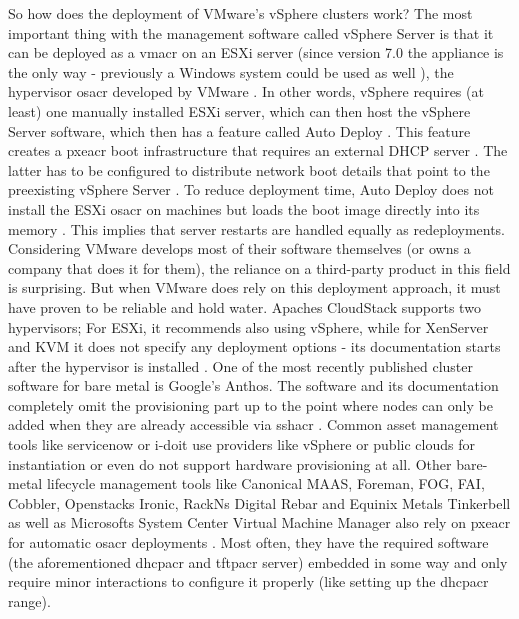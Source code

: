 So how does the deployment of VMware's vSphere clusters work? The most important thing with the management software called vSphere Server is that it can be deployed as a \gls{vmacr} on an ESXi server (since version 7.0 the appliance is the only way - previously a Windows system could be used as well \cite{vmware_farewell_windows}), the hypervisor \gls{osacr} developed by VMware \cite{vmware_vsphere_installation} \cite{vmware_vcenter_deployment}. In other words, vSphere requires (at least) one manually installed ESXi server, which can then host the vSphere Server software, which then has a feature called Auto Deploy \cite{vmware_installing_esxi}. This feature creates a \gls{pxeacr} boot infrastructure that requires an external DHCP server \cite{vmware_intro_autodeploy} \cite{vmware_autodeploy_process}. The latter has to be configured to distribute network boot details that point to the preexisting vSphere Server \cite{vmware_intro_autodeploy}.
To reduce deployment time, Auto Deploy does not install the ESXi \gls{osacr} on machines but loads the boot image directly into its memory \cite{vmware_provisioning_esxi_using_autodeploy}. This implies that server restarts are handled equally as redeployments.
\newline
Considering VMware develops most of their software themselves (or owns a company that does it for them), the reliance on a third-party product in this field is surprising. But when VMware does rely on this deployment approach, it must have proven to be reliable and hold water. %
Apaches CloudStack supports two hypervisors; For ESXi, it recommends also using vSphere, while for XenServer and KVM it does not specify any deployment options - its documentation starts after the hypervisor is installed \cite{cloudstack_installation}.
\newline
One of the most recently published cluster software for bare metal is Google's Anthos. The software and its documentation completely omit the provisioning part up to the point where nodes can only be added when they are already accessible via \gls{sshacr} \cite{anthos_bare_metal}.
\newline
Common asset management tools like servicenow or i-doit use providers like vSphere or public clouds for instantiation \cite{servicenow_setup_guide_vmware_cloud} or even do not support hardware provisioning \cite{idoit_vm_provisioning} at all.
\newline
Other bare-metal lifecycle management tools like Canonical MAAS, Foreman, FOG, FAI, Cobbler, Openstacks Ironic, RackNs Digital Rebar and Equinix Metals Tinkerbell as well as Microsofts System Center Virtual Machine Manager also rely on \gls{pxeacr} for automatic \gls{osacr} deployments \cite{maas_how_it_works} \cite{foreman_what_is} \cite{fog_introduction} \cite{fai_how_does_it_work} \cite{cobbler_documentation} \cite{openstack_ironic_docs} \cite{rackn_what_is_digital_rebar} \cite{tinkerbell_architecture} \cite{microsoft_provision_hyperv_bare_metal}. Most often, they have the required software (the aforementioned \gls{dhcpacr} and \gls{tftpacr} server) embedded in some way and only require minor interactions to configure it properly (like setting up the \gls{dhcpacr} range).
